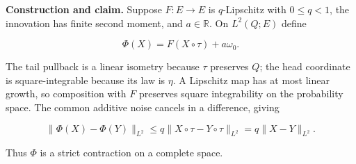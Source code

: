 \documentclass[11pt,a4paper]{article}
\begin{document}
\textbf{Construction and claim.} Suppose \(F:E\to E\) is \(q\)-Lipschitz with \(0\le q<1\), the innovation has finite second moment, and \(a\in\mathbb R\). On \(L^2(Q;E)\) define

\[\Phi(X)=F(X\circ\tau)+a\omega_0.\]


The tail pullback is a linear isometry because \(\tau\) preserves \(Q\); the head coordinate is square-integrable because its law is \(\eta\). A Lipschitz map has at most linear growth, so composition with \(F\) preserves square integrability on the probability space. The common additive noise cancels in a difference, giving

\[\|\Phi(X)-\Phi(Y)\|_{L^2}\le q\|X\circ\tau-Y\circ\tau\|_{L^2}
=q\|X-Y\|_{L^2}.\]


Thus \(\Phi\) is a strict contraction on a complete space.
\end{document}
